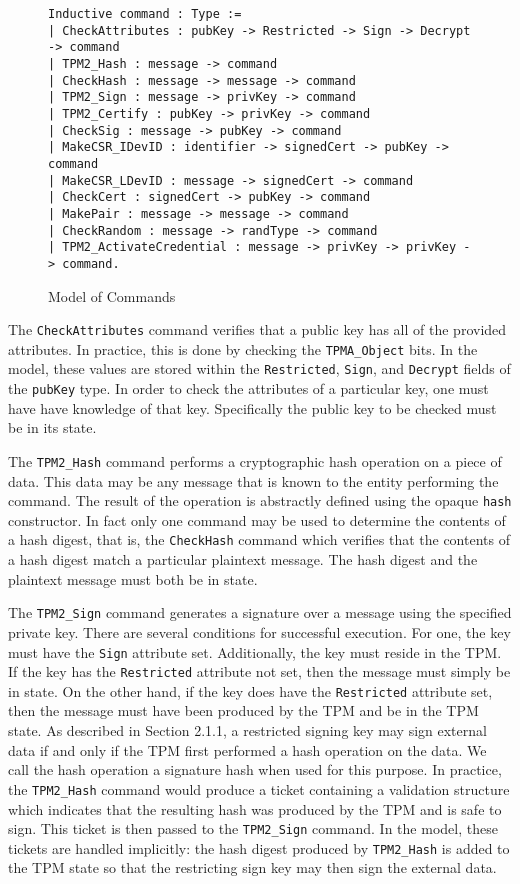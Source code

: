 \begin{figure}[h]
\begin{lstlisting}[language=Coq]
Inductive command : Type :=
| CheckAttributes : pubKey -> Restricted -> Sign -> Decrypt -> command
| TPM2_Hash : message -> command
| CheckHash : message -> message -> command
| TPM2_Sign : message -> privKey -> command
| TPM2_Certify : pubKey -> privKey -> command
| CheckSig : message -> pubKey -> command
| MakeCSR_IDevID : identifier -> signedCert -> pubKey -> command
| MakeCSR_LDevID : message -> signedCert -> command
| CheckCert : signedCert -> pubKey -> command
| MakePair : message -> message -> command
| CheckRandom : message -> randType -> command
| TPM2_ActivateCredential : message -> privKey -> privKey -> command.
\end{lstlisting}
\caption{Model of Commands}
\end{figure}

The \verb|CheckAttributes| command verifies that a public key has all of the provided attributes. In practice, this is done by checking the \verb|TPMA_Object|  bits. In the model, these values are stored within the \verb|Restricted|, \verb|Sign|, and \verb|Decrypt| fields of the \verb|pubKey| type. In order to check the attributes of a particular key, one must have have knowledge of that key. Specifically the public key to be checked must be in its state.

The \verb|TPM2_Hash| command performs a cryptographic hash operation on a piece of data. This data may be any message that is known to the entity performing the command. The result of the operation is abstractly defined using the opaque \verb|hash| constructor. In fact only one command may be used to determine the contents of a hash digest, that is, the \verb|CheckHash| command which verifies that the contents of a hash digest match a particular plaintext message. The hash digest and the plaintext message must both be in state. 

The \verb|TPM2_Sign| command generates a signature over a message using the specified private key. There are several conditions for successful execution. For one, the key must have the \verb|Sign| attribute set. Additionally, the key must reside in the TPM. If the key has the \verb|Restricted| attribute not set, then the message must simply be in state. On the other hand, if the key does have the \verb|Restricted| attribute set, then the message must have been produced by the TPM and be in the TPM state. As described in Section 2.1.1, a restricted signing key may sign external data if and only if the TPM first performed a hash operation on the data. We call the hash operation a signature hash when used for this purpose. In practice, the \verb|TPM2_Hash| command would produce a ticket containing a validation structure which indicates that the resulting hash was produced by the TPM and is safe to sign. This ticket is then passed to the \verb|TPM2_Sign| command. In the model, these tickets are handled implicitly: the hash digest produced by \verb|TPM2_Hash| is added to the TPM state so that the restricting sign key may then sign the external data. 


